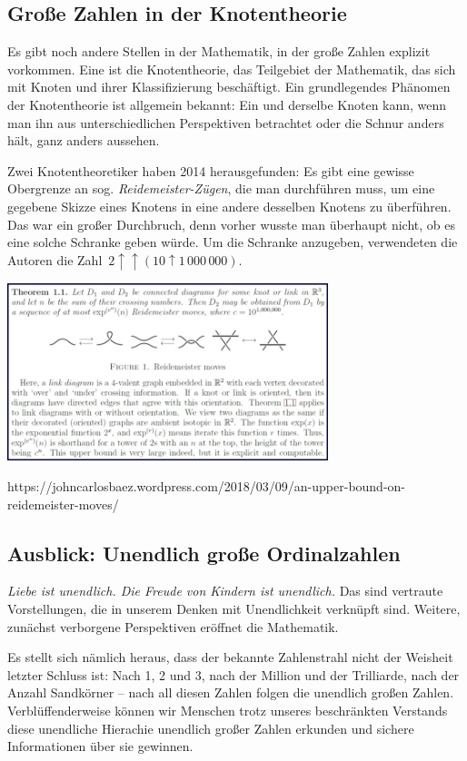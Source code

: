 \documentclass{../../zirkelblatt1718}
\theoremstyle{definition}
\theoremstyle{plain}
\theoremstyle{remark}
\begin{document}
\subsection{Große Zahlen in der Knotentheorie}

Es gibt noch andere Stellen in der Mathematik, in der große Zahlen explizit
vorkommen. Eine ist die Knotentheorie, das Teilgebiet der Mathematik, das sich
mit Knoten und ihrer Klassifizierung beschäftigt. Ein grundlegendes Phänomen
der Knotentheorie ist allgemein bekannt: Ein und derselbe Knoten kann, wenn man
ihn aus unterschiedlichen Perspektiven betrachtet oder die Schnur anders hält,
ganz anders aussehen.

Zwei Knotentheoretiker haben 2014 herausgefunden: Es gibt eine gewisse
Obergrenze an sog. \emph{Reidemeister-Zügen}, die man durchführen muss, um eine
gegebene Skizze eines Knotens in eine andere desselben Knotens zu überführen.
Das war ein großer Durchbruch, denn vorher wusste man überhaupt nicht, ob es
eine solche Schranke geben würde. Um die Schranke anzugeben, verwendeten die
Autoren die Zahl~$2 \uparrow\uparrow (10 \uparrow
1\,000\,000)$.

\begin{center}
\includegraphics[width=0.7\textwidth]{reidemeister}

https://johncarlosbaez.wordpress.com/2018/03/09/an-upper-bound-on-reidemeister-moves/
\end{center}


\subsection{Ausblick: Unendlich große Ordinalzahlen}

\emph{Liebe ist unendlich. Die Freude von Kindern ist unendlich.} Das sind
vertraute Vorstellungen, die in unserem Denken mit Unendlichkeit verknüpft
sind. Weitere, zunächst verborgene Perspektiven eröffnet die Mathematik.

Es stellt sich nämlich heraus, dass der bekannte Zahlenstrahl nicht der
Weisheit letzter Schluss ist: Nach 1, 2 und 3, nach der Million und der
Trilliarde, nach der Anzahl Sandkörner -- nach all diesen Zahlen folgen die
unendlich großen Zahlen. Verblüffenderweise können wir Menschen trotz unseres
beschränkten Verstands diese unendliche Hierachie unendlich großer Zahlen
erkunden und sichere Informationen über sie gewinnen.
\end{document}
